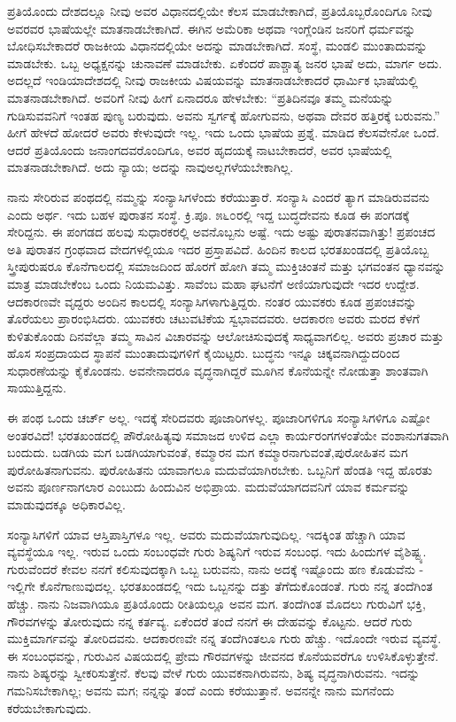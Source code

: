 ಪ್ರತಿಯೊಂದು ದೇಶದಲ್ಲೂ ನೀವು ಅವರ ವಿಧಾನದಲ್ಲಿಯೇ ಕೆಲಸ ಮಾಡಬೇಕಾಗಿದೆ, ಪ್ರತಿಯೊಬ್ಬರೊಂದಿಗೂ ನೀವು ಅವರವರ ಭಾಷೆಯಲ್ಲೇ ಮಾತನಾಡಬೇಕಾಗಿದೆ. ಈಗಿನ ಅಮೆರಿಕಾ ಅಥವಾ ಇಂಗ್ಲೆಂಡಿನ ಜನರಿಗೆ ಧರ್ಮವನ್ನು ಬೋಧಿಸಬೇಕಾದರೆ ರಾಜಕೀಯ ವಿಧಾನದಲ್ಲಿಯೇ ಅದನ್ನು ಮಾಡಬೇಕಾಗಿದೆ. ಸಂಸ್ಥೆ, ಮಂಡಲಿ ಮುಂತಾದುವನ್ನು ಮಾಡಬೇಕು. ಒಬ್ಬ ಅಧ್ಯಕ್ಷನನ್ನು ಚುನಾವಣೆ ಮಾಡಬೇಕು. ಏಕೆಂದರೆ ಪಾಶ್ಚಾತ್ಯ ಜನರ ಭಾಷೆ ಅದು, ಮಾರ್ಗ ಅದು. ಅದಲ್ಲದೆ ಇಂಡಿಯಾದೇಶದಲ್ಲಿ ನೀವು ರಾಜಕೀಯ ವಿಷಯವನ್ನು ಮಾತನಾಡಬೇಕಾದರೆ ಧಾರ್ಮಿಕ ಭಾಷೆಯಲ್ಲಿ ಮಾತನಾಡಬೇಕಾಗಿದೆ. ಅವರಿಗೆ ನೀವು ಹೀಗೆ ಏನಾದರೂ ಹೇಳಬೇಕು: “ಪ್ರತಿದಿನವೂ ತಮ್ಮ ಮನೆಯನ್ನು ಗುಡಿಸುವವನಿಗೆ ಇಂತಹ ಪುಣ್ಯ ಬರುವುದು. ಅವನು ಸ್ವರ್ಗಕ್ಕೆ ಹೋಗುವನು, ಅಥವಾ ದೇವರ ಹತ್ತಿರಕ್ಕೆ ಬರುವನು.” ಹೀಗೆ ಹೇಳದೆ ಹೋದರೆ ಅವರು ಕೇಳುವುದೇ ಇಲ್ಲ. ಇದು ಒಂದು ಭಾಷೆಯ ಪ್ರಶ್ನೆ. ಮಾಡಿದ ಕೆಲಸವೇನೋ ಒಂದೆ. ಆದರೆ ಪ್ರತಿಯೊಂದು ಜನಾಂಗದವರೊಂದಿಗೂ, ಅವರ ಹೃದಯಕ್ಕೆ ನಾಟಬೇಕಾದರೆ, ಅವರ ಭಾಷೆಯಲ್ಲಿ ಮಾತನಾಡಬೇಕಾಗಿದೆ. ಅದು ನ್ಯಾಯ; ಅದನ್ನು ನಾವು\break ಅಲ್ಲಗಳೆಯಬೇಕಾಗಿಲ್ಲ.

ನಾನು ಸೇರಿರುವ ಪಂಥದಲ್ಲಿ ನಮ್ಮನ್ನು ಸಂನ್ಯಾಸಿಗಳೆಂದು ಕರೆಯುತ್ತಾರೆ. ಸಂನ್ಯಾಸಿ ಎಂದರೆ ತ್ಯಾಗ ಮಾಡಿರುವವನು ಎಂದು ಅರ್ಥ. ಇದು ಬಹಳ ಪುರಾತನ ಸಂಸ್ಥೆ. ಕ್ರಿ.ಪೂ. ೫೬೦ರಲ್ಲಿ ಇದ್ದ ಬುದ್ಧದೇವನು ಕೂಡ ಈ ಪಂಗಡಕ್ಕೆ ಸೇರಿದ್ದನು. ಈ ಪಂಗಡದ ಹಲವು ಸುಧಾರಕರಲ್ಲಿ ಅವನೊಬ್ಬನು ಅಷ್ಟೆ. ಇದು ಅಷ್ಟು ಪುರಾತನವಾಗಿತ್ತು! ಪ್ರಪಂಚದ ಅತಿ ಪುರಾತನ ಗ್ರಂಥವಾದ ವೇದಗಳಲ್ಲಿಯೂ ಇದರ ಪ್ರಸ್ತಾಪವಿದೆ. ಹಿಂದಿನ ಕಾಲದ ಭರತಖಂಡದಲ್ಲಿ ಪ್ರತಿಯೊಬ್ಬ ಸ್ತ್ರೀಪುರುಷರೂ ಕೊನೆಗಾಲದಲ್ಲಿ ಸಮಾಜದಿಂದ ಹೊರಗೆ ಹೋಗಿ ತಮ್ಮ ಮುಕ್ತಿಚಿಂತನೆ ಮತ್ತು ಭಗವಂತನ ಧ್ಯಾನವನ್ನು ಮಾತ್ರ ಮಾಡಬೇಕೆಂಬ ಒಂದು ನಿಯಮವಿತ್ತು. ಸಾವೆಂಬ ಮಹಾ ಘಟನೆಗೆ ಅಣಿಯಾಗುವುದೇ ಇದರ ಉದ್ದೇಶ. ಆದಕಾರಣವೇ ವೃದ್ದರು ಅಂದಿನ ಕಾಲದಲ್ಲಿ ಸಂನ್ಯಾಸಿಗಳಾಗುತ್ತಿದ್ದರು. ನಂತರ ಯುವಕರು ಕೂಡ ಪ್ರಪಂಚವನ್ನು ತೊರೆಯಲು ಪ್ರಾರಂಭಿಸಿದರು. ಯುವಕರು ಚಟುವಟಿಕೆಯ ಸ್ವಭಾವದವರು. ಆದಕಾರಣ ಅವರು ಮರದ ಕೆಳಗೆ ಕುಳಿತುಕೊಂಡು ದಿನವೆಲ್ಲಾ ತಮ್ಮ ಸಾವಿನ ವಿಚಾರವನ್ನು ಆಲೋಚಿಸುವುದಕ್ಕೆ ಸಾಧ್ಯವಾಗಲಿಲ್ಲ. ಅವರು ಪ್ರಚಾರ ಮತ್ತು ಹೊಸ ಸಂಪ್ರದಾಯದ ಸ್ಥಾಪನೆ ಮುಂತಾದುವುಗಳಿಗೆ ಕೈಯಿಟ್ಟರು. ಬುದ್ಧನು ಇನ್ನೂ ಚಿಕ್ಕವನಾಗಿದ್ದುದರಿಂದ ಸುಧಾರಣೆಯನ್ನು ಕೈಕೊಂಡನು. ಅವನೇನಾದರೂ ವೃದ್ಧನಾಗಿದ್ದರೆ ಮೂಗಿನ ಕೊನೆಯನ್ನೇ ನೋಡುತ್ತಾ ಶಾಂತವಾಗಿ ಸಾಯುತ್ತಿದ್ದನು.

ಈ ಪಂಥ ಒಂದು ಚರ್ಚ್ ಅಲ್ಲ. ಇದಕ್ಕೆ ಸೇರಿದವರು ಪೂಜಾರಿಗಳಲ್ಲ. ಪೂಜಾರಿಗಳಿಗೂ ಸಂನ್ಯಾಸಿಗಳಿಗೂ ಎಷ್ಟೋ ಅಂತರವಿದೆ! ಭರತಖಂಡದಲ್ಲಿ ಪೌರೋಹಿತ್ಯವು ಸಮಾಜದ ಉಳಿದ ಎಲ್ಲಾ ಕಾರ್ಯರಂಗಗಳಂತೆಯೇ ವಂಶಾನುಗತವಾಗಿ ಬಂದುದು. ಬಡಗಿಯ ಮಗ ಬಡಗಿಯಾಗುವಂತೆ, ಕಮ್ಮಾರನ ಮಗ ಕಮ್ಮಾರನಾಗುವಂತೆ,\break ಪುರೋಹಿತನ ಮಗ ಪುರೋಹಿತನಾಗುವನು. ಪುರೋಹಿತನು ಯಾವಾಗಲೂ ಮದುವೆಯಾಗಿರಬೇಕು. ಒಬ್ಬನಿಗೆ ಹೆಂಡತಿ ಇದ್ದ ಹೊರತು ಅವನು ಪೂರ್ಣನಾಗಲಾರ ಎಂಬುದು ಹಿಂದುವಿನ ಅಭಿಪ್ರಾಯ. ಮದುವೆಯಾಗದವನಿಗೆ ಯಾವ ಕರ್ಮವನ್ನು ಮಾಡುವುದಕ್ಕೂ ಅಧಿಕಾರವಿಲ್ಲ.

ಸಂನ್ಯಾಸಿಗಳಿಗೆ ಯಾವ ಆಸ್ತಿಪಾಸ್ತಿಗಳೂ ಇಲ್ಲ. ಅವರು ಮದುವೆಯಾಗುವುದಿಲ್ಲ. ಇದಕ್ಕಿಂತ ಹೆಚ್ಚಾಗಿ ಯಾವ ವ್ಯವಸ್ಥೆಯೂ ಇಲ್ಲ. ಇರುವ ಒಂದು ಸಂಬಂಧವೇ ಗುರು ಶಿಷ್ಯನಿಗೆ ಇರುವ ಸಂಬಂಧ. ಇದು ಹಿಂದುಗಳ ವೈಶಿಷ್ಟ್ಯ. ಗುರುವೆಂದರೆ ಕೇವಲ ನನಗೆ ಕಲಿಸುವುದಕ್ಕಾಗಿ ಒಬ್ಬ ಬರುವನು, ನಾನು ಅದಕ್ಕೆ ಇಷ್ಟೊಂದು ಹಣ ಕೊಡುವೆನು - ಇಲ್ಲಿಗೇ ಕೊನೆಗಾಣುವುದಲ್ಲ. ಭರತಖಂಡದಲ್ಲಿ ಇದು ಒಬ್ಬನನ್ನು ದತ್ತು ತೆಗೆದುಕೊಂಡಂತೆ. ಗುರು ನನ್ನ ತಂದೆಗಿಂತ ಹೆಚ್ಚು. ನಾನು ನಿಜವಾಗಿಯೂ ಪ್ರತಿಯೊಂದು ರೀತಿಯಲ್ಲೂ ಅವನ ಮಗ. ತಂದೆಗಿಂತ ಮೊದಲು ಗುರುವಿಗೆ ಭಕ್ತಿ, ಗೌರವಗಳನ್ನು ತೋರುವುದು ನನ್ನ ಕರ್ತವ್ಯ. ಏಕೆಂದರೆ ತಂದೆ ನನಗೆ ಈ ದೇಹವನ್ನು ಕೊಟ್ಟನು. ಆದರೆ ಗುರು ಮುಕ್ತಿಮಾರ್ಗವನ್ನು ತೋರಿದವನು. ಆದಕಾರಣವೇ ನನ್ನ ತಂದೆಗಿಂತಲೂ ಗುರು ಹೆಚ್ಚು. ಇದೊಂದೇ ಇರುವ ವ್ಯವಸ್ಥೆ. ಈ ಸಂಬಂಧವನ್ನು, ಗುರುವಿನ ವಿಷಯದಲ್ಲಿ ಪ್ರೇಮ ಗೌರವಗಳನ್ನು ಜೀವನದ ಕೊನೆಯವರೆಗೂ ಉಳಿಸಿಕೊಳ್ಳುತ್ತೇನೆ. ನಾನು ಶಿಷ್ಯರನ್ನು ಸ್ವೀಕರಿಸುತ್ತೇನೆ. ಕೆಲವು ವೇಳೆ ಗುರು ಯುವಕನಾಗಿರುವನು, ಶಿಷ್ಯ ವೃದ್ಧನಾಗಿರುವನು. ಇದನ್ನು ಗಮನಿಸಬೇಕಾಗಿಲ್ಲ; ಅವನು ಮಗ; ನನ್ನನ್ನು ತಂದೆ ಎಂದು ಕರೆಯುತ್ತಾನೆ. ಅವನನ್ನೇ ನಾನು ಮಗನೆಂದು ಕರೆಯಬೇಕಾಗುವುದು.

